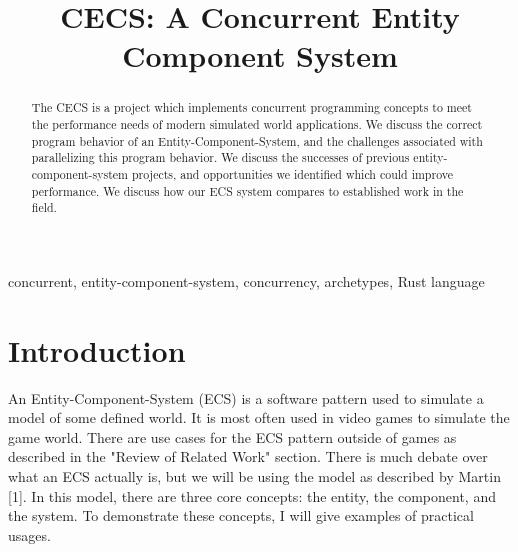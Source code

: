 \documentclass[conference]{IEEEtran}
\begin{document}
\title{CECS: A Concurrent Entity Component System}

\author{
\and
{}
\and
{}
}

\maketitle

\begin{abstract}
The CECS is a project which implements concurrent programming concepts
to meet the performance needs of modern simulated world applications. We discuss 
the correct program behavior of an Entity-Component-System, and the challenges
associated with parallelizing this program behavior. We discuss the successes 
of previous entity-component-system projects, and opportunities we identified which could improve performance. We discuss how our ECS system compares to established work in the field. 
\end{abstract}

\begin{IEEEkeywords}
concurrent, entity-component-system, concurrency, archetypes, Rust language
\end{IEEEkeywords}

\section{Introduction}
An Entity-Component-System (ECS) is a software pattern used to simulate a model of some defined world. It is most often used in video games to simulate the game world. There are use cases for the ECS pattern outside of games as described in the "Review of Related Work" section. There is much debate over what an ECS actually is, but we will be using the model as described by Martin [1]. In this model, there are three core concepts: the entity, the component, and the system. To demonstrate these concepts, I will give examples of practical usages.
\end{document}
